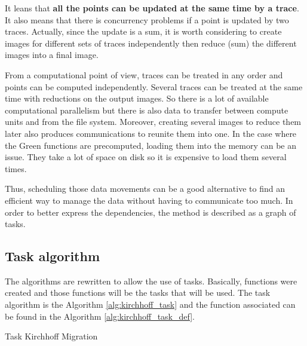 It leans that \textbf{all the points can be updated at the same time by a trace}.
It also means that there is concurrency problems if a point is updated by two traces.
Actually, since the update is a sum, it is worth considering to create images for different sets of traces independently then reduce (sum) the different images into a final image.

From a computational point of view, traces can be treated in any order and points can be computed independently.
Several traces can be treated at the same time with reductions on the output images.
So there is a lot of available computational parallelism but there is also data to transfer between compute units and from the file system.
Moreover, creating several images to reduce them later also produces communications to reunite them into one.
In the case where the Green functions are precomputed, loading them into the memory can be an issue.
They take a lot of space on disk so it is expensive to load them several times.

Thus, scheduling those data movements can be a good alternative to find an efficient way to manage the data without having to communicate too much.
In order to better express the dependencies, the method is described as a graph of tasks.

\subsection{Task algorithm}

The algorithms are rewritten to allow the use of tasks.
Basically, functions were created and those functions will be the tasks that will be used.
The task algorithm is the Algorithm \ref{alg:kirchhoff_task} and the function associated can be found in the Algorithm \ref{alg:kirchhoff_task_def}.

\begin{algorithm}[h]
	\DontPrintSemicolon
	\SetAlgoVlined
	\caption{Task Kirchhoff Migration \label{alg:kirchhoff_task}}
\end{algorithm}

